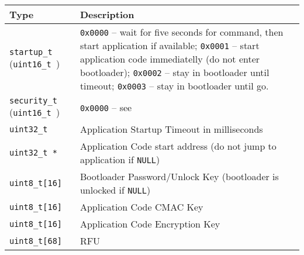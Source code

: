 \begin{table*}[!ht]
  \hspace*{-4cm}
  \begin{tabular}{| p{4cm} | p{9cm} | }
      \hline
      \rowcolor{SeaGreen3!30!} {\bf Type} & {\bf Description} \\
      \hline
      \hline
      {\tt startup\_t } \newline ({\tt uint16\_t })  & {\tt 0x0000} -- wait for five seconds for command, then start application if available;\newline
                          {\tt 0x0001} -- start application code immediatelly (do not enter bootloader);\newline
                          {\tt 0x0002} -- stay in bootloader until timeout;\newline 
                          {\tt 0x0003} -- stay in bootloader until go.\\
      \hline
      {\tt security\_t } \newline ({\tt uint16\_t }) & {\tt 0x0000} -- see \nameref{sec:arch:secModes}\\
      \hline
      {\tt uint32\_t}    & Application Startup Timeout in milliseconds \\
      \hline
      {\tt uint32\_t *}  & Application Code start address\newline
                           (do not jump to application if {\tt NULL}) \\
      \hline
      {\tt uint8\_t[16]} & Bootloader Password/Unlock Key\newline
                           (bootloader is unlocked if {\tt NULL}) \\
      \hline
      {\tt uint8\_t[16]} & Application Code CMAC Key \\
      \hline
      {\tt uint8\_t[16]} & Application Code Encryption Key \\
      \hline
      {\tt uint8\_t[68]} & RFU \\
      \hline
  \end{tabular}
  \label{tab:cfgStruct}
 \end{table*}
 

